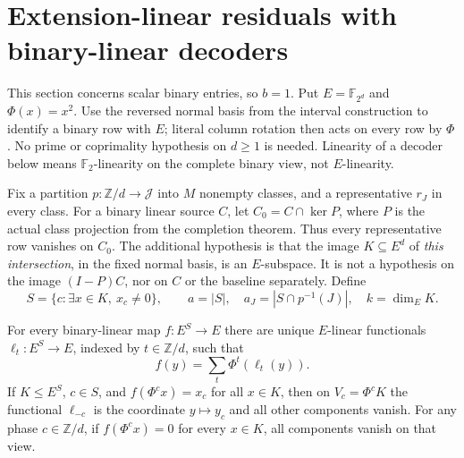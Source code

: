 \section{Extension-linear residuals with binary-linear decoders}
\label{sec:field-linear-residual}

This section concerns scalar binary entries, so $b=1$. Put
$E=\mathbb F_{2^d}$ and $\Phi(x)=x^2$. Use the reversed normal basis from
the interval construction to identify a binary row with $E$; literal column
rotation then acts on every row by $\Phi$. No prime or coprimality
hypothesis on $d\ge1$ is needed. Linearity of a decoder below means
$\mathbb F_2$-linearity on the complete binary view, not $E$-linearity.

Fix a partition $p:\mathbb Z/d\to\mathcal J$ into $M$ nonempty classes,
and a representative $r_J$ in every class. For a binary linear source $C$,
let $C_0=C\cap\ker P$, where $P$ is the actual class projection from the
completion theorem. Thus every representative row vanishes on $C_0$.
The additional hypothesis is that the image $K\subseteq E^d$ of
\emph{this intersection}, in the fixed normal basis, is an $E$-subspace.
It is not a hypothesis on the image $(I-P)C$, nor on $C$ or the baseline
separately. Define
\[
 S=\{c:\exists x\in K,\ x_c\ne0\},\qquad
 a=|S|,\quad a_J=|S\cap p^{-1}(J)|,\quad k=\dim_E K.
\]

\begin{lemma}\label{lem:frobenius-components}
For every binary-linear map $f:E^S\to E$ there are unique $E$-linear
functionals $\ell_t:E^S\to E$, indexed by $t\in\mathbb Z/d$, such that
\[
 f(y)=\sum_t\Phi^t(\ell_t(y)).
\]
If $K\le E^S$, $c\in S$, and $f(\Phi^c x)=x_c$ for all $x\in K$, then on
$V_c=\Phi^cK$ the functional $\ell_{-c}$ is the coordinate $y\mapsto y_c$
and all other components vanish. For any phase $c\in\mathbb Z/d$,
if $f(\Phi^cx)=0$ for every $x\in K$, all components vanish on that view.
\end{lemma}

